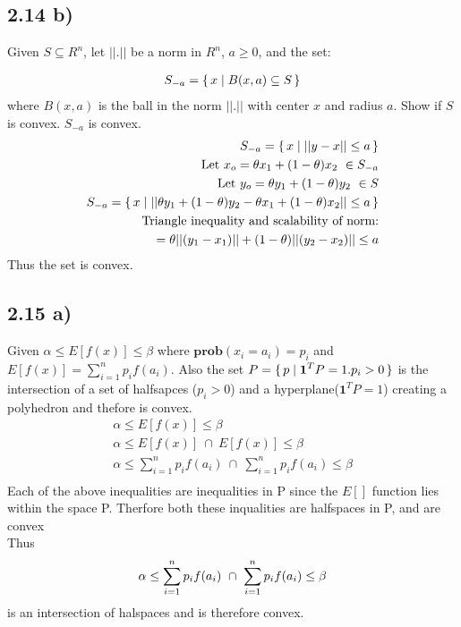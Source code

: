 \documentclass[12pt]{article}
\begin{document}
\subsection*{2.14 b)}
Given $S \subseteq R^n$, let $||.||$ be a norm in $R^n$, $a \ge 0$, and the set:

\begin{align*}
S_{-a} = \set{x | B(x,a) \subseteq S}
\end{align*}
where $B(x,a)$ is the ball in the norm $||.||$ with center $x$ and radius $a$. 
Show if $S$ is convex. $S_{-a}$ is convex.
\begin{align*}
S_{-a}  = \set{x | ||y-x|| \le a}\\
\text{Let $x_o = \theta x_1 + (1-\theta)x_2\ \in S_{-a}$}\\
\text{Let $y_o = \theta y_1 + (1-\theta)y_2\ \in S$}\\
S_{-a}  = \set{x | ||\theta y_1 + (1-\theta)y_2 - \theta x_1 + (1-\theta)x_2|| \le a}\\
\text{Triangle inequality and scalability of norm:}\\
= \theta||(y_1 - x_1)|| + (1-\theta)||(y_2-x_2)||
\le a
\end{align*}
Thus the set is convex.

\subsection*{2.15 a)}
Given $\alpha \le E[f(x)] \le \beta$ where $\textbf{prob}(x_i = a_i) = p_i$ and $E[f(x)]= \sum_{i=1}^{n}p_if(a_i)$.
Also the set $P = \set{p | \textbf{1}^TP = 1. p_i > 0}$ is the intersection of a set of halfsapces ($p_i>0$) and a hyperplane($\textbf{1}^TP = 1$) creating a polyhedron and thefore is convex.
\begin{align*}
\alpha \le E[f(x)] \le \beta\\
\alpha \le E[f(x)]\ \cap\ E[f(x)] \le \beta\\
\alpha \le \sum_{i=1}^{n}p_if(a_i)\ \cap\ \sum_{i=1}^{n}p_if(a_i) \le \beta\\
\end{align*}
Each of the above inequalities are inequalities in P since the $E[]$ function lies within the space P.
Therfore both these inqualities are halfspaces in P, and are convex\\
Thus $$\alpha \le \sum_{i=1}^{n}p_if(a_i)\ \cap\ \sum_{i=1}^{n}p_if(a_i) \le \beta\\$$ is an intersection of halspaces and is therefore convex.
\end{document}
